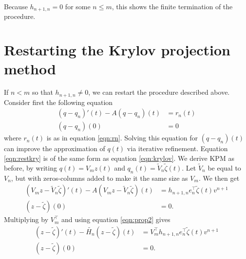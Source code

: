 Because $h_{n+1,n} = 0$ for some $n \leq m$, this shows the finite termination of the procedure. %


\section{Restarting the Krylov projection method} \label{sec:rest}
If $n < m$ so that $h_{n+1,n} \neq 0$, we can restart the procedure described above. Consider first the following equation
\begin{equation}\label{eqn:restkry}
\begin{aligned}
 (q-q_n)'(t) -A (q-q_n)(t) &= r_n(t) \\
(q-q_n)(0)& = 0
\end{aligned}
\end{equation}
where $r_n(t)$ is as in equation \eqref{eqn:rn}. Solving this equation for $(q-q_n)(t)$ can improve the approximation of $q(t)$ via iterative refinement.
Equation \eqref{eqn:restkry} is of the same form as equation \eqref{eqn:krylov}. We derive KPM as before, by writing $q(t) = V_m z(t)$ and $q_n(t) = \tilde{V}_n \tilde{\zeta}(t) $.
Let $\tilde{V}_n$ be equal to $V_n$, but with zeros-columns added to make it the same size as $V_m$. 
We then get
\begin{equation*}
\begin{aligned}
 (V_m z-\tilde{V}_n \tilde{\zeta})'(t)-A (V_m z-\tilde{V}_n \tilde{\zeta})(t) &=  h_{n+1,n}e_n^\top \tilde{\zeta}(t) v^{n+1}  \\
(z-\tilde{\zeta})(0)& = 0 .
\end{aligned}
\end{equation*}
Multiplying by $V_m^{\top}$ and using equation \eqref{eqn:prop2} gives
\begin{equation*}
\begin{aligned}
 (z-\tilde{\zeta})'(t)-\tilde{H_n} (z-\tilde{\zeta})(t) &= V_m^\top h_{n+1,n}e_n^\top \tilde{\zeta}(t) v^{n+1}  \\
(z-\tilde{\zeta})(0)& = 0.
\end{aligned}
\end{equation*}
